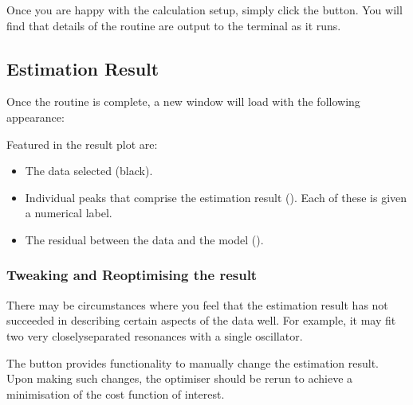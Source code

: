 \documentclass[letterpaper,10pt,english]{sphinxmanual}
\let\sphinxpxdimen\pdfpxdimen\else\newdimen\sphinxpxdimen
\begin{document}
\sphinxAtStartPar
Once you are happy with the calculation setup, simply click the  button.
You will find that details of the routine are output to the terminal as it
runs.




\subsection{Estimation Result}
\label{\detokenize{gui/usage/result:estimation-result}}\label{\detokenize{gui/usage/result::doc}}
\sphinxAtStartPar
Once the routine is complete, a new window will load with the following
appearance:

\noindent{\hspace*{\fill}\sphinxincludegraphics[width=400\sphinxpxdimen]{{result_window}.png}\hspace*{\fill}}

\sphinxAtStartPar
Featured in the result plot are:
\begin{itemize}
\item {} 
\sphinxAtStartPar
The data selected (black).

\item {} 
\sphinxAtStartPar
Individual peaks that comprise the estimation result
().
Each of these is given a numerical label.

\item {} 
\sphinxAtStartPar
The residual between the data and the model ().

\end{itemize}


\subsubsection{Tweaking and Re\sphinxhyphen{}optimising the result}
\label{\detokenize{gui/usage/result:tweaking-and-re-optimising-the-result}}
\sphinxAtStartPar
There may be circumstances where you feel that the estimation result has not
succeeded in describing certain aspects of the data well. For example, it may
fit two very closely\sphinxhyphen{}separated resonances with a single oscillator.

\sphinxAtStartPar
The  button provides functionality to manually change
the estimation result. Upon making such changes, the optimiser should be re\sphinxhyphen{}run
to achieve a minimisation of the cost function of interest.
\end{document}

